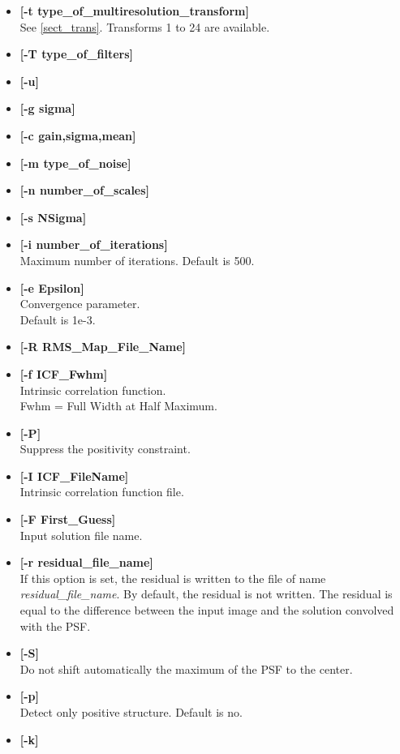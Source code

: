 \begin{itemize}
\begin{itemize}
\item {\bf [-t type\_of\_multiresolution\_transform]} \\
See \ref{sect_trans}. Transforms 1 to 24 are available.
\item {\bf [-T type\_of\_filters]}  
\item {\bf [-u]} 
\item {\bf [-g sigma]} 
\item {\bf [-c gain,sigma,mean]} 
\item {\bf [-m type\_of\_noise]} 
\item {\bf [-n number\_of\_scales]}
\item {\bf [-s NSigma]} 
\item {\bf [-i number\_of\_iterations]} \\
Maximum number of iterations. Default is  500.
\item {\bf [-e Epsilon]} \\
Convergence parameter. \\
Default is 1e-3.
\item {\bf [-R RMS\_Map\_File\_Name]} 
\item {\bf [-f ICF\_Fwhm]} \\
Intrinsic correlation function. \\
Fwhm = Full Width at Half Maximum.
\item {\bf [-P]} \\ 
 Suppress the positivity constraint.
\item {\bf [-I ICF\_FileName]} \\
Intrinsic correlation function file.
\item {\bf [-F First\_Guess]} \\
Input solution file name.
\item {\bf [-r residual\_file\_name]} \\
If this option is set, the residual is written to 
the file of name {\em residual\_file\_name}. By default, the
residual is not written. The residual is equal to the difference between
the input image and the solution convolved with the PSF.
\item {\bf [-S]} \\
Do not shift automatically the maximum of the PSF to the center.
\item {\bf [-p]} \\
Detect only positive structure. Default is no.
\item {\bf [-k]} \\

\end{itemize}
\end{itemize}
